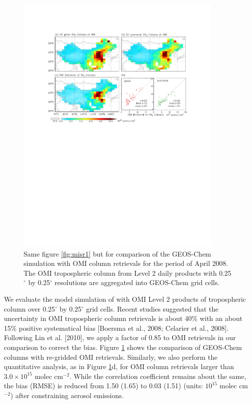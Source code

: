  \begin{figure}[t]
  \centering
  \includegraphics[width={0.9\textwidth}]{figures/a9.pdf}
  \caption{Same figure \ref{fig:misr1} but for comparison of the GEOS-Chem  simulation with OMI column  retrievals for the period of April 2008.  The OMI tropospheric column  from Level 2 daily products with 0.25$^{\circ}$ by 0.25$^{\circ}$ resolutions are aggregated into GEOS-Chem grid cells.}
  \label{fig:omno2}
 \end{figure}

 We evaluate the model simulation of  with OMI Level 2 products of
  tropospheric column over 0.25$^{\circ}$ by 0.25$^{\circ}$ grid cells.
 Recent studies suggested that the uncertainty in OMI  tropospheric column retrievals
 is about 40\% with an about 15\% positive systematical bias
 [Boersma et al., 2008; Celarier et al., 2008].
 Following Lin et al. [2010], we apply a factor of 0.85 to OMI  retrievals
 in our comparison to correct the bias.
 Figure \ref{fig:omno2} shows the comparison of GEOS-Chem  columns
 with re-gridded OMI  retrievals.
 Similarly, we also perform the quantitative analysis, as in Figure \ref{fig:omno2}d,
 for OMI  column retrievals larger than $3.0 \times 10^{15}$ molec cm$^{-2}$.
 While the correlation coefficient remains about the same, the bias (RMSE) is reduced
 from 1.50 (1.65) to 0.03 (1.51) (units: $10^{15}$ molec cm$^{-2}$) after constraining aerosol emissions. 

